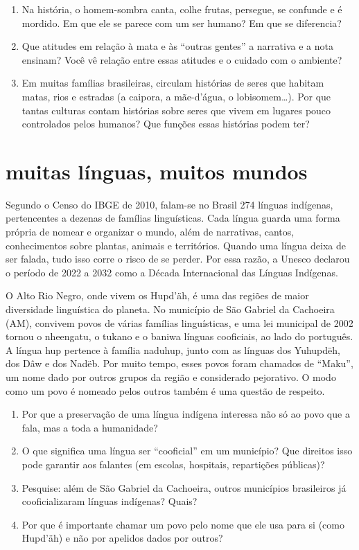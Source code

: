 \begin{enumerate}[label=\arabic*.,resume]
\item Na história, o homem-sombra canta, colhe frutas, persegue, se
confunde e é mordido. Em que ele se parece com um ser humano? Em que se
diferencia?
\item Que atitudes em relação à mata e às ``outras gentes'' a narrativa
e a nota ensinam? Você vê relação entre essas atitudes e o cuidado com o
ambiente?
\item Em muitas famílias brasileiras, circulam histórias de seres que
habitam matas, rios e estradas (a caipora, a mãe-d'água, o
lobisomem\ldots). Por que tantas culturas contam histórias sobre seres
que vivem em lugares pouco controlados pelos humanos? Que funções essas
histórias podem ter?
\end{enumerate}

\section{muitas línguas, muitos mundos}

Segundo o Censo do IBGE de 2010, falam-se no Brasil 274 línguas
indígenas, pertencentes a dezenas de famílias linguísticas. Cada língua
guarda uma forma própria de nomear e organizar o mundo, além de
narrativas, cantos, conhecimentos sobre plantas, animais e territórios.
Quando uma língua deixa de ser falada, tudo isso corre o risco de se
perder. Por essa razão, a Unesco declarou o período de 2022 a 2032 como a
Década Internacional das Línguas Indígenas.

O Alto Rio Negro, onde vivem os Hupd'äh, é uma das regiões de maior
diversidade linguística do planeta. No município de São Gabriel da
Cachoeira (AM), convivem povos de várias famílias linguísticas, e uma
lei municipal de 2002 tornou o nheengatu, o tukano e o baniwa línguas
cooficiais, ao lado do português. A língua hup pertence à família
naduhup, junto com as línguas dos Yuhupdëh, dos Dâw e dos Nadëb. Por
muito tempo, esses povos foram chamados de ``Maku'', um nome dado por
outros grupos da região e considerado pejorativo. O modo como um povo é
nomeado pelos outros também é uma questão de respeito.

\begin{enumerate}[label=\arabic*.,resume]
\item Por que a preservação de uma língua indígena interessa não só ao
povo que a fala, mas a toda a humanidade?
\item O que significa uma língua ser ``cooficial'' em um município? Que
direitos isso pode garantir aos falantes (em escolas, hospitais,
repartições públicas)?
\item Pesquise: além de São Gabriel da Cachoeira, outros municípios
brasileiros já cooficializaram línguas indígenas? Quais?
\item Por que é importante chamar um povo pelo nome que ele usa para si
(como Hupd'äh) e não por apelidos dados por outros?
\end{enumerate}

